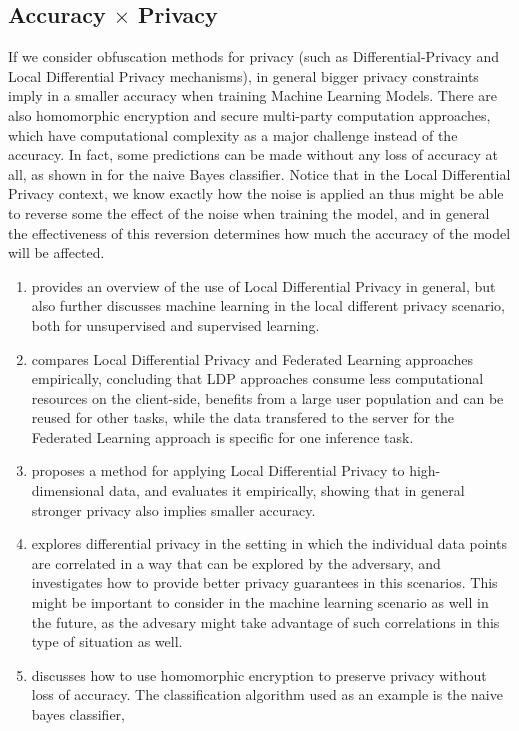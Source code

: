 \subsection{Accuracy $\times$ Privacy}

If we consider obfuscation methods for privacy (such as Differential-Privacy and Local Differential Privacy mechanisms), in general bigger privacy constraints imply in a smaller accuracy when training Machine Learning Models. There are also homomorphic encryption and secure multi-party computation approaches, which have computational complexity as a major challenge instead of the accuracy. In fact, some predictions can be made without any loss of accuracy at all, as shown in \cite{Privacy-preserving classification of customer data without loss of accuracy} for the naive Bayes classifier. Notice that in the Local Differential Privacy context, we know exactly how the noise is applied an thus might be able to reverse some the effect of the noise when training the model, and in general the effectiveness of this reversion determines how much the accuracy of the model will be affected.

\begin{enumerate}
\item \cite{Local differential privacy and its applications: A comprehensive survey} provides an overview of the use of Local Differential Privacy in general, but also further discusses machine learning in the local different privacy scenario, both for unsupervised and supervised learning.
\item \cite{Preserving User Privacy for Machine Learning: Local Differential Privacy or Federated Machine Learning?} compares Local Differential Privacy and Federated Learning approaches empirically, concluding that LDP approaches consume less computational resources on the client-side, benefits from a large user population and can be reused for other tasks, while the data transfered to the server for the Federated Learning approach is specific for one inference task.
\item \cite{LoPub : High-Dimensional Crowdsourced Data Publication With Local Differential Privacy} proposes a method for applying Local Differential Privacy to high-dimensional data, and evaluates it empirically, showing that in general stronger privacy also implies smaller accuracy.
\item \cite{About dependence between individuals: Dependence Makes You Vulnerable: Differential Privacy Under Dependent Tuples} explores differential privacy in the setting in which the individual data points are correlated in a way that can be explored by the adversary, and investigates how to provide better privacy guarantees in this scenarios. This might be important to consider in the machine learning scenario as well in the future, as the advesary might take advantage of such correlations in this type of situation as well.
\item \cite{Privacy-preserving classification of customer data without loss of accuracy} discusses how to use homomorphic encryption to preserve privacy without loss of accuracy. The classification algorithm used as an example is the naive bayes classifier,
\end{enumerate}

